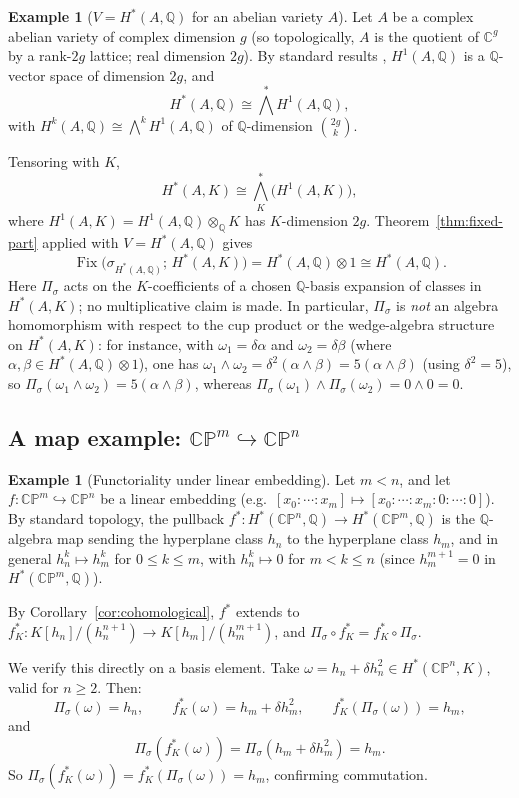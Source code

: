 \documentclass[11pt, a4paper]{amsart}
\theoremstyle{definition}
\newtheorem{example}[theorem]{Example}
\newcommand{\Q}{\mathbb{Q}}
\newcommand{\C}{\mathbb{C}}
\newcommand{\Fix}{\operatorname{Fix}}
\newcommand{\CP}{\mathbb{CP}}
\begin{document}
\begin{example}[$V = H^*(A, \Q)$ for an abelian variety $A$]
\label{ex:abelian}
Let $A$ be a complex abelian variety of complex dimension $g$
(so topologically, $A$ is the quotient of $\C^g$ by a rank-$2g$
lattice; real dimension $2g$). By standard results
\cite[Ch.~2]{GriffithsHarris}, $H^1(A, \Q)$ is a $\Q$-vector space
of dimension $2g$, and
\[
  H^*(A, \Q) \cong \bigwedge^* H^1(A, \Q),
\]
with $H^k(A, \Q) \cong \bigwedge^k H^1(A, \Q)$ of $\Q$-dimension
$\binom{2g}{k}$.

Tensoring with $K$,
\[
  H^*(A, K) \cong \bigwedge_K^* \big(H^1(A, K)\big),
\]
where $H^1(A, K) = H^1(A, \Q) \otimes_\Q K$ has $K$-dimension $2g$.
Theorem~\ref{thm:fixed-part} applied with
$V = H^*(A, \Q)$ gives
\[
  \Fix\big(\sigma_{H^*(A, \Q)};\, H^*(A, K)\big)
  = H^*(A, \Q) \otimes 1 \cong H^*(A, \Q).
\]
Here $\Pi_\sigma$ acts on the $K$-coefficients of a chosen
$\Q$-basis expansion of classes in $H^*(A, K)$; no multiplicative
claim is made. In particular, $\Pi_\sigma$ is \emph{not} an algebra
homomorphism with respect to the cup product or the wedge-algebra
structure on $H^*(A, K)$: for instance, with $\omega_1 = \delta
\alpha$ and $\omega_2 = \delta \beta$ (where $\alpha, \beta \in
H^*(A, \Q) \otimes 1$), one has $\omega_1 \wedge \omega_2 =
\delta^2 (\alpha \wedge \beta) = 5 (\alpha \wedge \beta)$ (using
$\delta^2 = 5$), so $\Pi_\sigma(\omega_1 \wedge \omega_2) = 5
(\alpha \wedge \beta)$, whereas $\Pi_\sigma(\omega_1) \wedge
\Pi_\sigma(\omega_2) = 0 \wedge 0 = 0$.
\end{example}

\subsection{A map example: $\CP^m \hookrightarrow \CP^n$}

\begin{example}[Functoriality under linear embedding]
\label{ex:embedding}
Let $m < n$, and let $f \colon \CP^m \hookrightarrow \CP^n$ be a
linear embedding (e.g.\ $[x_0 : \cdots : x_m] \mapsto [x_0 :
\cdots : x_m : 0 : \cdots : 0]$). By standard topology, the
pullback $f^* \colon H^*(\CP^n, \Q) \to H^*(\CP^m, \Q)$ is the
$\Q$-algebra map sending the hyperplane class $h_n$ to the
hyperplane class $h_m$, and in general $h_n^k \mapsto h_m^k$ for
$0 \leq k \leq m$, with $h_n^k \mapsto 0$ for $m < k \leq n$ (since
$h_m^{m+1} = 0$ in $H^*(\CP^m, \Q)$).

By Corollary~\ref{cor:cohomological}, $f^*$ extends to
$f^*_K \colon K[h_n]/(h_n^{n+1}) \to K[h_m]/(h_m^{m+1})$, and
$\Pi_\sigma \circ f^*_K = f^*_K \circ \Pi_\sigma$.

We verify this directly on a basis element. Take $\omega =
h_n + \delta h_n^2 \in H^*(\CP^n, K)$, valid for $n \geq 2$. Then:
\[
  \Pi_\sigma(\omega) = h_n, \qquad
  f^*_K(\omega) = h_m + \delta h_m^2, \qquad
  f^*_K(\Pi_\sigma(\omega)) = h_m,
\]
and
\[
  \Pi_\sigma(f^*_K(\omega)) = \Pi_\sigma(h_m + \delta h_m^2)
  = h_m.
\]
So $\Pi_\sigma(f^*_K(\omega)) = f^*_K(\Pi_\sigma(\omega)) = h_m$,
confirming commutation.
\end{example}
\end{document}
